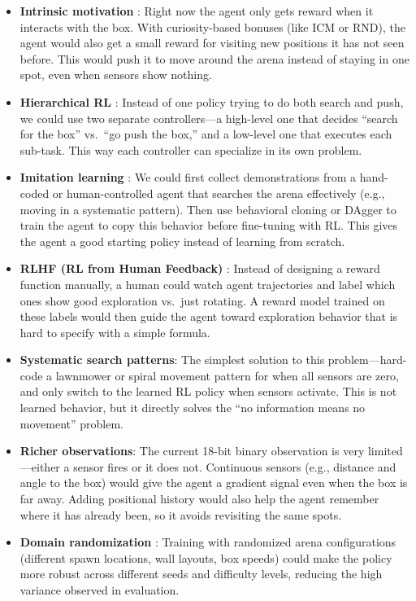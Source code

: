 \documentclass[10.5pt, oneside]{article}
\begin{document}
\begin{itemize}[nosep]
    \item \textbf{Intrinsic motivation} \cite{pathak2017curiosity, burda2018exploration}: Right now the agent only gets reward when it interacts with the box. With curiosity-based bonuses (like ICM or RND), the agent would also get a small reward for visiting new positions it has not seen before. This would push it to move around the arena instead of staying in one spot, even when sensors show nothing.

    \item \textbf{Hierarchical RL} \cite{vezhnevets2017feudal}: Instead of one policy trying to do both search and push, we could use two separate controllers---a high-level one that decides ``search for the box'' vs.\ ``go push the box,'' and a low-level one that executes each sub-task. This way each controller can specialize in its own problem.

    \item \textbf{Imitation learning} \cite{ross2011dagger}: We could first collect demonstrations from a hand-coded or human-controlled agent that searches the arena effectively (e.g., moving in a systematic pattern). Then use behavioral cloning or DAgger to train the agent to copy this behavior before fine-tuning with RL. This gives the agent a good starting policy instead of learning from scratch.

    \item \textbf{RLHF (RL from Human Feedback)} \cite{christiano2017deep}: Instead of designing a reward function manually, a human could watch agent trajectories and label which ones show good exploration vs.\ just rotating. A reward model trained on these labels would then guide the agent toward exploration behavior that is hard to specify with a simple formula.

    \item \textbf{Systematic search patterns}: The simplest solution to this problem---hard-code a lawnmower or spiral movement pattern for when all sensors are zero, and only switch to the learned RL policy when sensors activate. This is not learned behavior, but it directly solves the ``no information means no movement'' problem.

    \item \textbf{Richer observations}: The current 18-bit binary observation is very limited---either a sensor fires or it does not. Continuous sensors (e.g., distance and angle to the box) would give the agent a gradient signal even when the box is far away. Adding positional history would also help the agent remember where it has already been, so it avoids revisiting the same spots.

    \item \textbf{Domain randomization} \cite{tobin2017domain}: Training with randomized arena configurations (different spawn locations, wall layouts, box speeds) could make the policy more robust across different seeds and difficulty levels, reducing the high variance observed in evaluation.
\end{itemize}
\end{document}
